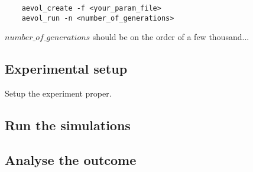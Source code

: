 \begin{verbatim}
	aevol_create -f <your_param_file>
	aevol_run -n <number_of_generations>
\end{verbatim}

$number\_of\_generations$ should be on the order of a few thousand...


\subsection{Experimental setup}
Setup the experiment proper.


\subsection{Run the simulations}


\subsection{Analyse the outcome}


\clearemptydoublepage






